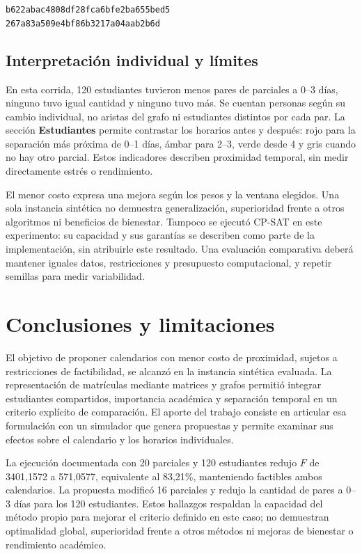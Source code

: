 \documentclass[12pt,letterpaper]{article}
\begin{document}
\begin{center}\begin{minipage}{\linewidth}\centering\footnotesize\texttt{b622abac4808df28fca6bfe2ba655bed5}\\
\texttt{267a83a509e4bf86b3217a04aab2b6d}\end{minipage}\end{center}

\subsection{Interpretación individual y límites}
En esta corrida, 120 estudiantes tuvieron menos pares de parciales a 0--3 días, ninguno tuvo igual cantidad y ninguno tuvo más. Se cuentan personas según su cambio individual, no aristas del grafo ni estudiantes distintos por cada par. La sección \textbf{Estudiantes} permite contrastar los horarios antes y después: rojo para la separación más próxima de 0--1 días, ámbar para 2--3, verde desde 4 y gris cuando no hay otro parcial. Estos indicadores describen proximidad temporal, sin medir directamente estrés o rendimiento.

El menor costo expresa una mejora según los pesos y la ventana elegidos. Una sola instancia sintética no demuestra generalización, superioridad frente a otros algoritmos ni beneficios de bienestar. Tampoco se ejecutó CP-SAT en este experimento: su capacidad y sus garantías se describen como parte de la implementación, sin atribuirle este resultado. Una evaluación comparativa deberá mantener iguales datos, restricciones y presupuesto computacional, y repetir semillas para medir variabilidad.

\section{Conclusiones y limitaciones}
El objetivo de proponer calendarios con menor costo de proximidad, sujetos a restricciones de factibilidad, se alcanzó en la instancia sintética evaluada. La representación de matrículas mediante matrices y grafos permitió integrar estudiantes compartidos, importancia académica y separación temporal en un criterio explícito de comparación. El aporte del trabajo consiste en articular esa formulación con un simulador que genera propuestas y permite examinar sus efectos sobre el calendario y los horarios individuales.

La ejecución documentada con 20 parciales y 120 estudiantes redujo $F$ de 3401,1572 a 571,0577, equivalente al 83,21\%, manteniendo factibles ambos calendarios. La propuesta modificó 16 parciales y redujo la cantidad de pares a 0--3 días para los 120 estudiantes. Estos hallazgos respaldan la capacidad del método propio para mejorar el criterio definido en este caso; no demuestran optimalidad global, superioridad frente a otros métodos ni mejoras de bienestar o rendimiento académico.
\end{document}
